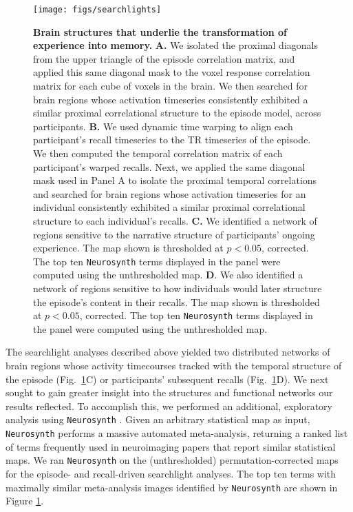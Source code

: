 \documentclass[10pt]{article}
\begin{document}
\begin{figure}[tp]
\centering
\texttt{[image: figs/searchlights]}
\caption{\small \textbf{Brain structures that underlie the transformation of experience into memory.} \textbf{A.} We isolated the proximal diagonals from the upper triangle of the episode correlation matrix, and applied this same diagonal mask to the voxel response correlation matrix for each cube of voxels in the brain. We then searched for brain regions whose activation timeseries consistently exhibited a similar proximal correlational structure to the episode model, across participants.  \textbf{B.} We used dynamic time warping \citep{BernClif94} to align each participant's recall timeseries to the TR timeseries of the episode.  We then computed the temporal correlation matrix of each participant's warped recalls.  Next, we applied the same diagonal mask used in Panel A to isolate the proximal temporal correlations and searched for brain regions whose activation timeseries for an individual consistently exhibited a similar proximal correlational structure to each individual's recalls.  \textbf{C.} We identified a network of regions sensitive to the narrative structure of participants' ongoing experience.  The map shown is thresholded at $p < 0.05$, corrected.  The top ten \texttt{Neurosynth} terms displayed in the panel were computed using the unthresholded map.  \textbf{D}. We also identified a network of regions sensitive to how individuals would later structure the episode's content in their recalls.  The map shown is thresholded at $p < 0.05$, corrected.  The top ten \texttt{Neurosynth} terms displayed in the panel were computed using the unthresholded map.}
\label{fig:brainz}
\end{figure}

The searchlight analyses described above yielded two distributed networks of brain regions whose activity timecourses tracked with the temporal structure of the episode (Fig.~\ref{fig:brainz}C) or participants' subsequent recalls (Fig.~\ref{fig:brainz}D).  We next sought to gain greater insight into the structures and functional networks our results reflected.  To accomplish this, we performed an additional, exploratory analysis using \texttt{Neurosynth} \citep{YarkEtal11}.  Given an arbitrary statistical map as input, \texttt{Neurosynth} performs a massive automated meta-analysis, returning a ranked list of terms frequently used in neuroimaging papers that report similar statistical maps. We ran \texttt{Neurosynth} on the (unthresholded) permutation-corrected maps for the episode- and recall-driven searchlight analyses. The top ten terms with maximally similar meta-analysis images identified by \texttt{Neurosynth} are shown in Figure \ref{fig:brainz}.
\end{document}
